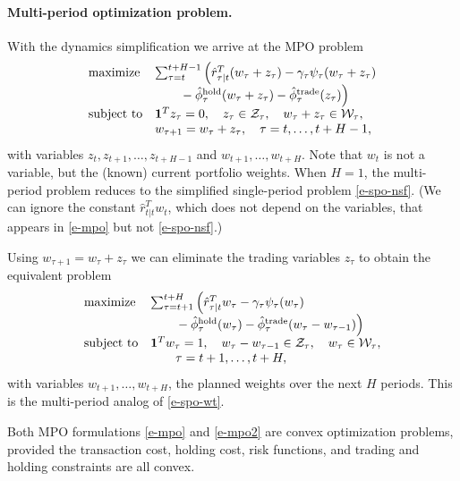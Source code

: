 \documentclass[openany]{now}
\newcommand{\trcosthat}{\hat \phi^\mathrm{trade}}
\newcommand{\hldcosthat}{\hat \phi^\mathrm{hold}}
\begin{document}
\paragraph{Multi-period optimization problem.}
With the dynamics simplification we arrive at the MPO problem
\begin{equation}\label{e-mpo}
\begin{array}{ll}
\mbox{maximize} &
\sum_{\tau=t}^{t+H-1}
\Big(\hat r_{\tau|t}^T (w_\tau + z_\tau)
-\gamma_\tau \psi_\tau(w_\tau+z_\tau) \mbox{} \\
& \qquad \mbox{} - \hldcosthat_\tau (w_\tau + z_\tau)
- \trcosthat_\tau (z_\tau) \Big) \\
\mbox{subject to} &
\ones^Tz_\tau = 0, \quad
z_\tau \in \mathcal Z_\tau, \quad
w_\tau + z_\tau \in \mathcal W_\tau, \\
& w_{\tau+1} = w_\tau + z_\tau,
\quad \tau = t,\ldots, t+H-1,
\end{array}
\end{equation}
with variables $z_t, z_{t+1}, \ldots, z_{t+H-1}$ and
$w_{t+1}, \ldots, w_{t+H}$.
Note that $w_t$ is not a variable, but the (known) current portfolio weights.
When $H=1$, the multi-period problem reduces to the simplified
single-period problem \eqref{e-spo-nsf}.
(We can ignore the constant $\hat r_{t|t}^T w_t$, which does not
depend on the variables, that appears
in \eqref{e-mpo} but not \eqref{e-spo-nsf}.)

Using $w_{\tau+1}=w_\tau+z_\tau$
we can eliminate the trading variables $z_\tau$ to obtain the equivalent
problem
\begin{equation}\label{e-mpo2}
\begin{array}{ll}
\mbox{maximize} &
\sum_{\tau=t+1}^{t+H} \Big(\hat r_{\tau|t}^T w_\tau
-\gamma_\tau \psi_\tau(w_\tau) \mbox{}\\
& \qquad \mbox{}  - \hldcosthat_\tau (w_\tau)
- \trcosthat_\tau (w_\tau-w_{\tau-1}) \Big) \\
\mbox{subject to} & \ones^Tw_\tau=1, \quad
w_\tau - w_{\tau-1} \in \mathcal Z_\tau,
\quad w_\tau \in \mathcal W_\tau,\\
& \qquad \tau = t+1, \ldots, t+H,
\end{array}
\end{equation}
with variables $w_{t+1}, \ldots, w_{t+H}$, the planned weights
over the next $H$ periods.
This is the multi-period analog of \eqref{e-spo-wt}.

Both MPO formulations \eqref{e-mpo} and \eqref{e-mpo2} are convex optimization
problems, provided the transaction cost, holding cost, risk functions,
and trading and holding constraints are all convex.
\end{document}
